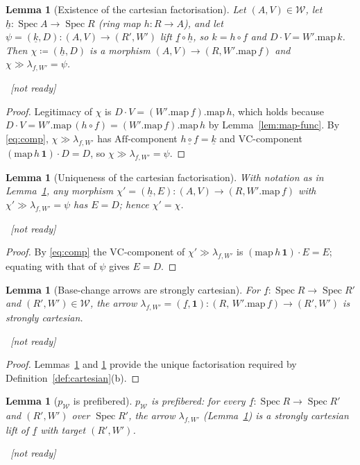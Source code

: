 \documentclass[11pt]{article}
\newcommand{\lean}[1]{\par\smallskip\noindent{\footnotesize\texttt{Lean:\ #1}}\par}
\newcommand{\uses}[1]{}
\newcommand{\notready}{{\footnotesize\textcolor{red!60!black}{\ [not ready]}}}
\theoremstyle{definition}
\theoremstyle{plain}
\newtheorem{lemma}[definition]{Lemma}
\theoremstyle{remark}
\newcommand{\Aff}{\mathrm{Aff}}
\newcommand{\Spec}{\operatorname{Spec}}
\newcommand{\Weier}{\mathcal{W}}
\newcommand{\VC}{\mathrm{VC}}
\newcommand{\map}{\mathrm{map}}
\newcommand{\onel}{\mathbf 1}
\begin{document}
\begin{lemma}[Existence of the cartesian factorisation]\label{lem:scart-exist}
Let $(A,V)\in\Weier$, let $\underline h:\Spec A\to\Spec R$ (ring map $h:R\to A$),
and let $\psi=(\underline{k},D):(A,V)\to(R',W')$ lift
$\underline f\circ\underline h$, so $k=h\circ f$ and $D\cdot V=W'.\map\,k$.  Then
$\chi\coloneqq(\underline h,D)$ is a morphism $(A,V)\to(R,W'.\map\,f)$ and
$\chi\gg\lambda_{f,W'}=\psi$.
\lean{}\notready
\uses{lem:scart-welldef,def:total-comp,lem:map-func}
\end{lemma}
\begin{proof}
Legitimacy of $\chi$ is $D\cdot V=(W'.\map\,f).\map\,h$, which holds because
$D\cdot V=W'.\map\,(h\circ f)=(W'.\map\,f).\map\,h$ by Lemma~\ref{lem:map-func}.
By \eqref{eq:comp}, $\chi\gg\lambda_{f,W'}$ has $\Aff$-component
$\underline{h\circ f}=\underline k$ and $\VC$-component
$(\map\,h\,\onel)\cdot D=D$, so $\chi\gg\lambda_{f,W'}=\psi$.
\end{proof}

\begin{lemma}[Uniqueness of the cartesian factorisation]\label{lem:scart-uniq}
With notation as in Lemma~\ref{lem:scart-exist}, any morphism
$\chi'=(\underline h,E):(A,V)\to(R,W'.\map\,f)$ with
$\chi'\gg\lambda_{f,W'}=\psi$ has $E=D$; hence $\chi'=\chi$.
\lean{}\notready
\uses{def:total-comp}
\end{lemma}
\begin{proof}
By \eqref{eq:comp} the $\VC$-component of $\chi'\gg\lambda_{f,W'}$ is
$(\map\,h\,\onel)\cdot E=E$; equating with that of $\psi$ gives $E=D$.
\end{proof}

\begin{lemma}[Base-change arrows are strongly cartesian]\label{lem:scart}
For $\underline f:\Spec R\to\Spec R'$ and $(R',W')\in\Weier$, the arrow
$\lambda_{f,W'}=(\underline f,\onel):(R,\,W'.\map\,f)\to(R',W')$ is strongly
cartesian.
\lean{}\notready
\uses{def:cartesian,lem:scart-welldef,lem:scart-exist,lem:scart-uniq}
\end{lemma}
\begin{proof}
Lemmas~\ref{lem:scart-exist} and \ref{lem:scart-uniq} provide the unique
factorisation required by Definition~\ref{def:cartesian}(b).
\end{proof}

\begin{lemma}[$p_{\Weier}$ is prefibered]\label{lem:weier-prefibered}
$p_{\Weier}$ is prefibered: for every $\underline f:\Spec R\to\Spec R'$ and
$(R',W')$ over $\Spec R'$, the arrow $\lambda_{f,W'}$ (Lemma~\ref{lem:scart}) is a
strongly cartesian lift of $\underline f$ with target $(R',W')$.
\lean{}\notready
\uses{def:isfibered,lem:scart,def:proj}
\end{lemma}
\end{document}
